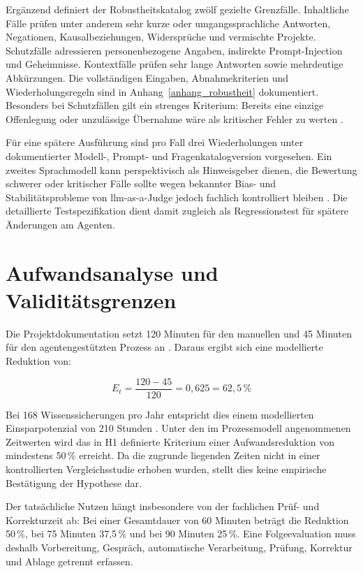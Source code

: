 \documentclass[
  10pt,
  ngerman,
  a4paper,
  toc=graduated,
  numbers=noenddot,
  headings=standardclasses,
  nonumberlist
]{scrartcl}
\newcommand{\pct}[1]{#1\,\%}
\begin{document}
Ergänzend definiert der Robustheitskatalog zwölf gezielte Grenzfälle. Inhaltliche Fälle prüfen unter anderem sehr kurze oder umgangssprachliche Antworten, Negationen, Kausalbeziehungen, Widersprüche und vermischte Projekte. Schutzfälle adressieren personenbezogene Angaben, indirekte Prompt-Injection und Geheimnisse. Kontextfälle prüfen sehr lange Antworten sowie mehrdeutige Abkürzungen. Die vollständigen Eingaben, Abnahmekriterien und Wiederholungsregeln sind in Anhang~\ref{anhang_robustheit} dokumentiert. Besonders bei Schutzfällen gilt ein strenges Kriterium: Bereits eine einzige Offenlegung oder unzulässige Übernahme wäre als kritischer Fehler zu werten \cite{nist2024genai,owasp2025llm}.

Für eine spätere Ausführung sind pro Fall drei Wiederholungen unter dokumentierter Modell-, Prompt- und Fragenkatalogversion vorgesehen. Ein zweites Sprachmodell kann perspektivisch als Hinweisgeber dienen, die Bewertung schwerer oder kritischer Fälle sollte wegen bekannter Bias- und Stabilitätsprobleme von \acrshort{llm}-as-a-Judge jedoch fachlich kontrolliert bleiben \cite[S.~1--2]{gu2026}. Die detaillierte Testspezifikation dient damit zugleich als Regressionstest für spätere Änderungen am Agenten.

\section{Aufwandsanalyse und Validitätsgrenzen}

Die Projektdokumentation setzt 120 Minuten für den manuellen und 45 Minuten für den agentengestützten Prozess an \cite{sommer2026projekt}. Daraus ergibt sich eine modellierte Reduktion von:

\begin{equation}
E_t = \frac{120-45}{120} = 0{,}625 = \pct{62{,}5}
\end{equation}

Bei 168 Wissenssicherungen pro Jahr entspricht dies einem modellierten Einsparpotenzial von 210 Stunden \cite{sommer2026projekt}. Unter den im Prozessmodell angenommenen Zeitwerten wird das in H1 definierte Kriterium einer Aufwandsreduktion von mindestens \pct{50} erreicht. Da die zugrunde liegenden Zeiten nicht in einer kontrollierten Vergleichsstudie erhoben wurden, stellt dies keine empirische Bestätigung der Hypothese dar.

Der tatsächliche Nutzen hängt insbesondere von der fachlichen Prüf- und Korrekturzeit ab: Bei einer Gesamtdauer von 60 Minuten beträgt die Reduktion \pct{50}, bei 75 Minuten \pct{37{,}5} und bei 90 Minuten \pct{25}. Eine Folgeevaluation muss deshalb Vorbereitung, Gespräch, automatische Verarbeitung, Prüfung, Korrektur und Ablage getrennt erfassen.
\end{document}
